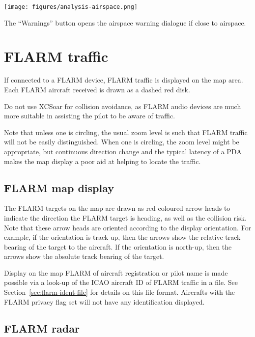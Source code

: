 \begin{center}
\texttt{[image: figures/analysis-airspace.png]}
\end{center}

The ``Warnings'' button opens the airspace warning dialogue if close to
airspace.


\section{FLARM traffic}

If connected to a FLARM device, FLARM traffic is displayed on the map
area.  Each FLARM aircraft received is drawn as a dashed red disk.

\warning Do not use XCSoar for collision avoidance, as
FLARM audio devices are much more suitable in assisting the pilot to be
aware of traffic.

Note that unless one is circling, the usual zoom level is such that
FLARM traffic will not be easily distinguished. When one is circling,
the zoom level might be appropriate, but continuous direction change and
the typical latency of a PDA makes the map display a poor aid at helping
to locate the traffic.


\subsection*{FLARM map display}

The FLARM targets on the map are drawn as red coloured 
arrow heads to indicate the direction the FLARM target is
heading, as well as the collision risk.  Note that these
arrow heads are oriented according to the display orientation.  For example, if 
the orientation is track-up, then the arrows show the relative track bearing of
the target to the aircraft.  If the orientation is north-up, then the arrows show the
absolute track bearing of the target.

Display on the map FLARM of aircraft registration or pilot name is
made possible via a look-up of the ICAO aircraft ID of FLARM traffic
in a file.  See Section~\ref{sec:flarm-ident-file} for details on this
file format.  Aircrafts with the FLARM privacy flag set will not have
any identification displayed.


\subsection*{FLARM radar}

